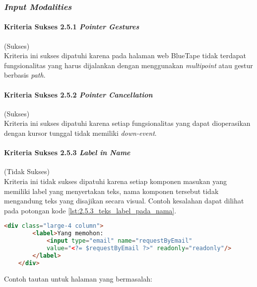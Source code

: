 \subsubsection{\textit{Input Modalities}}
\label{subsubsec:kepatuhan_bluetape_input_modalities}

\paragraph{Kriteria Sukses 2.5.1 \textit{Pointer Gestures}}
\label{par:kepatuhan_bluetape_kriteria_sukses_2.5.1}
(Sukses)\\

Kriteria ini sukses dipatuhi karena pada halaman web BlueTape tidak terdapat fungsionalitas yang harus dijalankan dengan menggunakan \textit{multipoint} atau gestur berbasis \textit{path}.

\paragraph{Kriteria Sukses 2.5.2 \textit{Pointer Cancellation}}
\label{par:kepatuhan_bluetape_kriteria_sukses_2.5.2}
(Sukses)\\

Kriteria ini sukses dipatuhi karena setiap fungsionalitas yang dapat dioperasikan dengan kursor tunggal tidak memiliki \textit{down-event}.

\paragraph{Kriteria Sukses 2.5.3 \textit{Label in Name}}
\label{par:kepatuhan_bluetape_kriteria_sukses_2.5.3}
(Tidak Sukses)\\

Kriteria ini tidak sukses dipatuhi karena setiap komponen masukan yang memiliki label yang menyertakan teks, nama komponen tersebut tidak mengandung teks yang disajikan secara visual. Contoh kesalahan dapat dilihat pada potongan kode \ref{lst:2.5.3_teks_label_pada_nama}.

\begin{lstlisting}[frame=single, label={lst:2.5.3_teks_label_pada_nama}, language=HTML, caption=Kriteria Sukses 2.5.3 - Teks Label pada Atribut Nama]
    <div class="large-4 column">
        <label>Yang memohon:
            <input type="email" name="requestByEmail" 
            value="<?= $requestByEmail ?>" readonly="readonly"/>
        </label>
    </div>
\end{lstlisting}
Contoh tautan untuk halaman yang bermasalah: 


